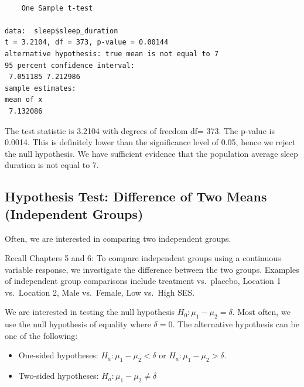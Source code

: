 \documentclass[
  letterpaper,
  DIV=11,
  numbers=noendperiod]{scrartcl}
\providecommand{\tightlist}{%
  \setlength{\itemsep}{0pt}\setlength{\parskip}{0pt}}
\begin{document}
\begin{verbatim}

    One Sample t-test

data:  sleep$sleep_duration
t = 3.2104, df = 373, p-value = 0.00144
alternative hypothesis: true mean is not equal to 7
95 percent confidence interval:
 7.051185 7.212986
sample estimates:
mean of x 
 7.132086 
\end{verbatim}

The test statistic is 3.2104 with degrees of freedom df= 373. The
p-value is 0.0014. This is definitely lower than the significance level
of 0.05, hence we reject the null hypothesis. We have sufficient
evidence that the population average sleep duration is not equal to 7.

\subsection{Hypothesis Test: Difference of Two Means (Independent
Groups)}\label{hypothesis-test-difference-of-two-means-independent-groups}

Often, we are interested in comparing two independent groups.

\begin{tcolorbox}[enhanced jigsaw, bottomtitle=1mm, colback=white, opacityback=0, leftrule=.75mm, opacitybacktitle=0.6, coltitle=black, left=2mm, colframe=quarto-callout-note-color-frame, toptitle=1mm, colbacktitle=quarto-callout-note-color!10!white, titlerule=0mm, title=\textcolor{quarto-callout-note-color}{\faInfo}\hspace{0.5em}{Note}, arc=.35mm, rightrule=.15mm, breakable, bottomrule=.15mm, toprule=.15mm]

Recall Chapters 5 and 6: To compare independent groups using a
continuous variable response, we investigate the difference between the
two groups. Examples of independent group comparisons include treatment
vs.~placebo, Location 1 vs.~Location 2, Male vs.~Female, Low vs.~High
SES.

\end{tcolorbox}

We are interested in testing the null hypothesis
\(H_0: \mu_1-\mu_2=\delta\). Most often, we use the null hypothesis of
equality where \(\delta=0\). The alternative hypothesis can be one of
the following:

\begin{itemize}
\tightlist
\item
  One-sided hypotheses: \(H_a: \mu_1-\mu_2 < \delta\) or
  \(H_a: \mu_1-\mu_2 > \delta\).
\item
  Two-sided hypotheses: \(H_a: \mu_1-\mu_2 \neq \delta\)
\end{itemize}
\end{document}
